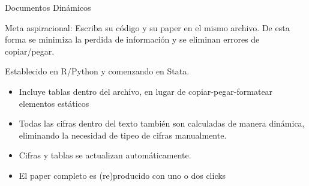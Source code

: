 \documentclass{beamer}
\begin{document}
{%
    \begin{frame}[plain]
     \end{frame}

}


\begin{frame}{Documentos Dinámicos}

Meta aspiracional: Escriba su código y su paper en el mismo archivo. De esta forma se minimiza la perdida de información y se eliminan errores de copiar/pegar.

\medskip
Establecido en R/Python y comenzando en Stata.
\begin{itemize}[<.->]
\item Incluye tablas dentro del archivo, en lugar de copiar-pegar-formatear elementos estáticos
\item Todas las cifras dentro del texto también son calculadas de manera dinámica, eliminando la necesidad de tipeo de cifras manualmente.
\item Cifras y tablas se actualizan automáticamente.
\item El paper completo es (re)producido con uno o dos clicks
\end{itemize} 
\end{frame}
\end{document}

